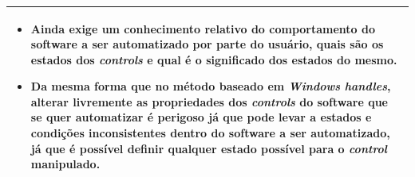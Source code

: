 \documentclass[tg]{mdtufsm}
\begin{document}
{\begin{tabularx}{\textwidth}{|*{1}{>{\centering\arraybackslash}X}|}
\begin{itemize}
                        \item Ainda exige um conhecimento relativo do comportamento do software a ser automatizado por parte do usuário, quais são os estados dos \emph{controls} e qual é o significado dos estados do mesmo.
                        \item Da mesma forma que no método baseado em \emph{Windows handles}, alterar livremente as propriedades dos \emph{controls} do software que se quer automatizar é perigoso já que pode levar a estados e condições inconsistentes dentro do software a ser automatizado, já que é possível definir qualquer estado possível para o \emph{control} manipulado.
                    \end{itemize}
                    \\ \hline
                \end{tabularx}

}
\end{document}
